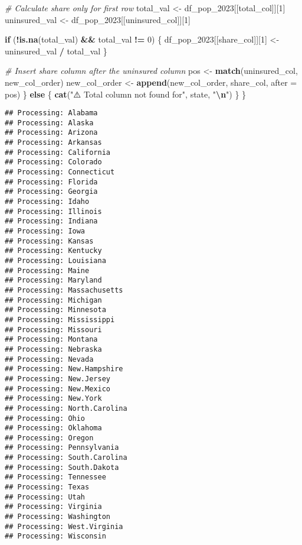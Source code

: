 \documentclass[
]{article}
\newenvironment{Shaded}{\begin{snugshade}}{\end{snugshade}}
\newcommand{\AttributeTok}[1]{\textcolor[rgb]{0.13,0.29,0.53}{#1}}
\newcommand{\CommentTok}[1]{\textcolor[rgb]{0.56,0.35,0.01}{\textit{#1}}}
\newcommand{\ControlFlowTok}[1]{\textcolor[rgb]{0.13,0.29,0.53}{\textbf{#1}}}
\newcommand{\DecValTok}[1]{\textcolor[rgb]{0.00,0.00,0.81}{#1}}
\newcommand{\FunctionTok}[1]{\textcolor[rgb]{0.13,0.29,0.53}{\textbf{#1}}}
\newcommand{\NormalTok}[1]{#1}
\newcommand{\OtherTok}[1]{\textcolor[rgb]{0.56,0.35,0.01}{#1}}
\newcommand{\SpecialCharTok}[1]{\textcolor[rgb]{0.81,0.36,0.00}{\textbf{#1}}}
\newcommand{\StringTok}[1]{\textcolor[rgb]{0.31,0.60,0.02}{#1}}
\begin{document}
\begin{Shaded}
\begin{Highlighting}[]
    \CommentTok{\# Calculate share only for first row}
\NormalTok{    total\_val }\OtherTok{\textless{}{-}}\NormalTok{ df\_pop\_2023[[total\_col]][}\DecValTok{1}\NormalTok{]}
\NormalTok{    uninsured\_val }\OtherTok{\textless{}{-}}\NormalTok{ df\_pop\_2023[[uninsured\_col]][}\DecValTok{1}\NormalTok{]}
    
    \ControlFlowTok{if}\NormalTok{ (}\SpecialCharTok{!}\FunctionTok{is.na}\NormalTok{(total\_val) }\SpecialCharTok{\&\&}\NormalTok{ total\_val }\SpecialCharTok{!=} \DecValTok{0}\NormalTok{) \{}
\NormalTok{      df\_pop\_2023[[share\_col]][}\DecValTok{1}\NormalTok{] }\OtherTok{\textless{}{-}}\NormalTok{ uninsured\_val }\SpecialCharTok{/}\NormalTok{ total\_val}
\NormalTok{    \}}
    
    \CommentTok{\# Insert share column after the uninsured column}
\NormalTok{    pos }\OtherTok{\textless{}{-}} \FunctionTok{match}\NormalTok{(uninsured\_col, new\_col\_order)}
\NormalTok{    new\_col\_order }\OtherTok{\textless{}{-}} \FunctionTok{append}\NormalTok{(new\_col\_order, share\_col, }\AttributeTok{after =}\NormalTok{ pos)}
\NormalTok{  \} }\ControlFlowTok{else}\NormalTok{ \{}
    \FunctionTok{cat}\NormalTok{(}\StringTok{"⚠️ Total column not found for"}\NormalTok{, state, }\StringTok{"}\SpecialCharTok{\textbackslash{}n}\StringTok{"}\NormalTok{)}
\NormalTok{  \}}
\NormalTok{\}}
\end{Highlighting}
\end{Shaded}

\begin{verbatim}
## Processing: Alabama 
## Processing: Alaska 
## Processing: Arizona 
## Processing: Arkansas 
## Processing: California 
## Processing: Colorado 
## Processing: Connecticut 
## Processing: Florida 
## Processing: Georgia 
## Processing: Idaho 
## Processing: Illinois 
## Processing: Indiana 
## Processing: Iowa 
## Processing: Kansas 
## Processing: Kentucky 
## Processing: Louisiana 
## Processing: Maine 
## Processing: Maryland 
## Processing: Massachusetts 
## Processing: Michigan 
## Processing: Minnesota 
## Processing: Mississippi 
## Processing: Missouri 
## Processing: Montana 
## Processing: Nebraska 
## Processing: Nevada 
## Processing: New.Hampshire 
## Processing: New.Jersey 
## Processing: New.Mexico 
## Processing: New.York 
## Processing: North.Carolina 
## Processing: Ohio 
## Processing: Oklahoma 
## Processing: Oregon 
## Processing: Pennsylvania 
## Processing: South.Carolina 
## Processing: South.Dakota 
## Processing: Tennessee 
## Processing: Texas 
## Processing: Utah 
## Processing: Virginia 
## Processing: Washington 
## Processing: West.Virginia 
## Processing: Wisconsin
\end{verbatim}
\end{document}

